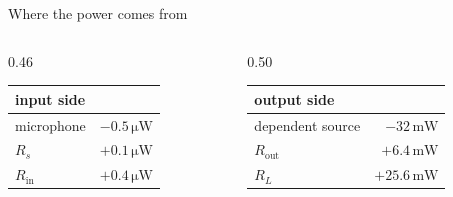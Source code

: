 \documentclass[11pt,aspectratio=169]{beamer}
\newcommand{\uni}[1]{\,\mathrm{#1}}
\begin{document}
\begin{frame}{Where the power comes from}
  \vfill
  \begin{columns}[c,onlytextwidth]
    \begin{column}{0.46\textwidth}
      \begin{center}
      \begin{tabular}{@{}l r@{}}
      \toprule
      \textbf{input side} & \\
      \midrule
      microphone & $-0.5\uni{\mu W}$\\
      $R_s$      & $+0.1\uni{\mu W}$\\
      $R_{\mathrm{in}}$ & $+0.4\uni{\mu W}$\\
      \bottomrule
      \end{tabular}
      \end{center}
    \end{column}
    \begin{column}{0.50\textwidth}
      \begin{center}
      \begin{tabular}{@{}l r@{}}
      \toprule
      \textbf{output side} & \\
      \midrule
      dependent source & $-32\uni{mW}$\\
      $R_{\mathrm{out}}$ & $+6.4\uni{mW}$\\
      $R_L$            & $+25.6\uni{mW}$\\
      \bottomrule
      \end{tabular}
      \end{center}
    \end{column}
  \end{columns}
  \vfill
  \begin{center}
    \\[6pt]
  \end{center}
  \vfill
\end{frame}
\end{document}
